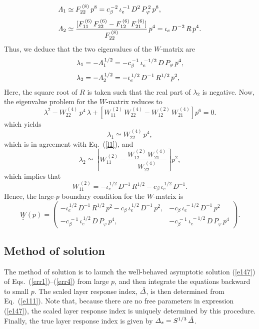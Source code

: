 \documentclass[12pt,prb,aps]{revtex4-1}
\begin{document}
 \begin{align}
 {\mit\Lambda}_1&\simeq F_{22}^{\,(8)}\,p^8=  c_\beta^{\,-2}\,\iota_e^{\,-1}\,D^2\,P_\varphi^{\,2}\,p^8,\\[0.5ex]
 {\mit\Lambda}_2 &\simeq \frac{[F_{11}^{\,(6)}\,F_{22}^{\,(6)} - F_{12}^{\,(6)}\,F_{21}^{\,(6)}]}{F_{22}^{\,(8)}}\,p^4= \iota_e\,D^{-2}\,R\,p^4.
 \end{align}
 Thus, we deduce that the two eigenvalues of the $W$-matrix are 
 \begin{align}\label{l1}
 \lambda_1&=-{\mit\Lambda}_1^{\,1/2}= -c_\beta^{\,-1}\,\iota_e^{\,-1/2}\,D\,P_\varphi\,p^4,\\[0.5ex]
 \lambda_2&=-{\mit\Lambda}_2^{\,1/2}=-\iota_e^{\,1/2}\,D^{-1}\,R^{1/2}\,p^2,
 \end{align}
 Here, the square root of $R$ is taken such that the real part of $\lambda_2$ is negative. 
  Now, the eigenvalue problem for the $W$-matrix reduces to 
 \begin{equation}
 \lambda^{2} - W_{22}^{\,(4)}\,p^4\,\lambda + \left[W_{11}^{\,(2)}\,W_{22}^{\,(4)} - W_{12}^{\,(2)}\,W_{21}^{\,(4)}\right]p^6 = 0.
 \end{equation}
which yields
\begin{equation}
\lambda_1\simeq W_{22}^{\,(4)}\,p^4,
\end{equation}
which is in agreement with Eq.~(\ref{l1}), and
\begin{equation}
\lambda_2 \simeq \left[W_{11}^{\,(2)} - \frac{W_{12}^{\,(2)}\,W_{21}^{\,(4)}}{W_{22}^{\,(4)}}\right]p^2,
\end{equation}
 which implies that
 \begin{equation}
 W_{11}^{\,(2)} = -\iota_e^{\,1/2}\,D^{-1}\,R^{1/2}-c_\beta\,\iota_e^{\,1/2}\,D^{-1}.
 \end{equation}
 Hence, the large-$p$ boundary condition for the $W$-matrix
 is
 \begin{equation}\label{e147}
 \underline{\underline{W}}(p) =  \left(\begin{array}{cc} -\iota_e^{\,1/2}\,D^{-1}\,R^{1/2}\,p^2-c_\beta\,\iota_e^{\,1/2}\,D^{-1}\,p^2,& - c_\beta\,\iota_e^{\,-1/2}\,D^{-1}\,p^2\\-c_\beta^{\,-1}\,\iota_e^{\,1/2}\,D\,P_\varphi\,p^4,&-c_\beta^{\,-1}\,\iota_e^{\,-1/2}\,D\,P_\varphi\,p^4\end{array}\right).
 \end{equation}

\subsection{Method of solution}
The method of solution is to launch the well-behaved asymptotic solution (\ref{e147}) of Eqs.~(\ref{err1})--(\ref{err4}) from large $p$, and then
integrate the equations backward to small $p$. The scaled layer response index, $\hat{\mit\Delta}$, is then determined  from Eq.~(\ref{e111}). 
Note that, because there are no free parameters in expression (\ref{e147}), the scaled layer response index is uniquely determined by this procedure. 
Finally, the true layer response index is given by ${\mit\Delta}_s= S^{1/3}\,\hat{\mit\Delta}$. 
\end{document}
